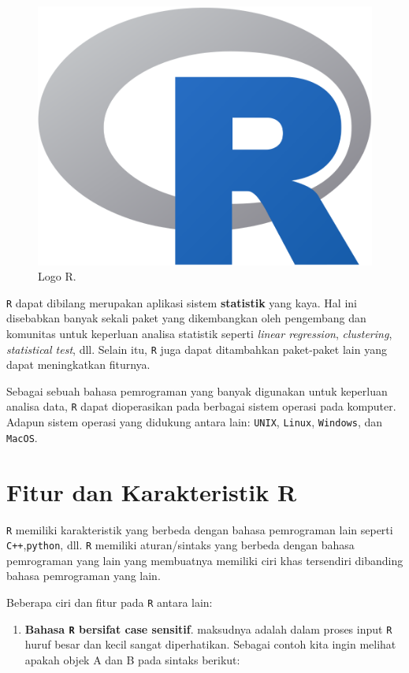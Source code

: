 \documentclass[]{book}
\providecommand{\tightlist}{%
  \setlength{\itemsep}{0pt}\setlength{\parskip}{0pt}}
\theoremstyle{definition}
\theoremstyle{definition}
\theoremstyle{definition}
\theoremstyle{remark}
\begin{document}
\begin{figure}

{\centering \includegraphics[width=0.4\linewidth]{./images/r-icon} 

}

\caption{Logo R.}\label{fig:Logo}
\end{figure}

\texttt{R} dapat dibilang merupakan aplikasi sistem \textbf{statistik} yang kaya. Hal ini disebabkan banyak sekali paket yang dikembangkan oleh pengembang dan komunitas untuk keperluan analisa statistik seperti \emph{linear regression}, \emph{clustering}, \emph{statistical test}, dll. Selain itu, \texttt{R} juga dapat ditambahkan paket-paket lain yang dapat meningkatkan fiturnya.

Sebagai sebuah bahasa pemrograman yang banyak digunakan untuk keperluan analisa data, \texttt{R} dapat dioperasikan pada berbagai sistem operasi pada komputer. Adapun sistem operasi yang didukung antara lain: \texttt{UNIX}, \texttt{Linux}, \texttt{Windows}, dan \texttt{MacOS}.

\hypertarget{fiturR}{%
\section{Fitur dan Karakteristik R}\label{fiturR}}

\texttt{R} memiliki karakteristik yang berbeda dengan bahasa pemrograman lain seperti \texttt{C++},\texttt{python}, dll. \texttt{R} memiliki aturan/sintaks yang berbeda dengan bahasa pemrograman yang lain yang membuatnya memiliki ciri khas tersendiri dibanding bahasa pemrograman yang lain.

Beberapa ciri dan fitur pada \texttt{R} antara lain:

\begin{enumerate}
\def\labelenumi{\arabic{enumi}.}
\tightlist
\item
  \textbf{Bahasa \texttt{R} bersifat case sensitif}. maksudnya adalah dalam proses input \texttt{R} huruf besar dan kecil sangat diperhatikan. Sebagai contoh kita ingin melihat apakah objek A dan B pada sintaks berikut:
\end{enumerate}
\end{document}

